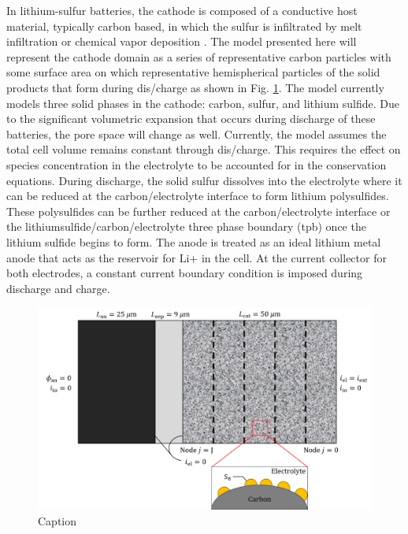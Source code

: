 \documentclass{elsarticle}
\begin{document}
In lithium-sulfur batteries, the cathode is composed of a conductive host material, typically carbon based, in which the sulfur is infiltrated by melt infiltration or chemical vapor deposition \cite{BRUCKNER201482}. The model presented here will represent the cathode domain as a series of representative carbon particles with some surface area on which representative hemispherical particles of the solid products that form during dis/charge as shown in Fig. \ref{fig:modeldomain}. The model currently models three solid phases in the cathode: carbon, sulfur, and lithium sulfide. Due to the significant volumetric expansion that occurs during discharge of these batteries, the pore space will change as well. Currently, the model assumes the total cell volume remains constant through dis/charge. This requires the effect on species concentration in the electrolyte to be accounted for in the conservation equations. During discharge, the solid sulfur dissolves into the electrolyte where it can be reduced at the carbon/electrolyte interface to form lithium polysulfides. These polysulfides can be further reduced at the carbon/electrolyte interface or the lithiumsulfide/carbon/electrolyte three phase boundary (tpb) once the lithium sulfide begins to form. The anode is treated as an ideal lithium metal anode that acts as the reservoir for Li+ in the cell. At the current collector for both electrodes, a constant current boundary condition is imposed during discharge and charge. 

\begin{center}
\begin{figure}
    \centering
    \includegraphics[width=\textwidth]{model_domain.png}
    \caption{Caption}
    \label{fig:modeldomain}
\end{figure}
\end{center}
\end{document}

